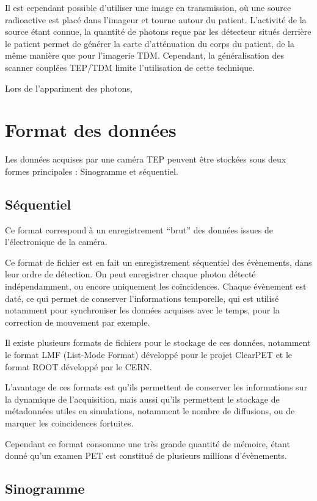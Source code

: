 Il est cependant possible d'utiliser une image en transmission, où une source radioactive est placé dans l'imageur et tourne autour du patient. L'activité de la source étant connue, la quantité de photons reçue par les détecteur situés derrière le patient permet de générer la carte d'atténuation du corps du patient, de la même manière que pour l'imagerie TDM. Cependant, la généralisation des scanner couplées TEP/TDM limite l'utilisation de cette technique.



Lors de l'appariment des photons, 


	\section{Format des données}
Les données acquises par une caméra TEP peuvent être stockées sous deux formes principales : Sinogramme et séquentiel.
		\subsection{Séquentiel}

Ce format correspond à un enregistrement ``brut'' des données issues de l'électronique de la caméra.

Ce format de fichier est en fait un enregistrement séquentiel des évènements, dans leur ordre de détection. On peut enregistrer chaque photon détecté indépendamment, ou encore uniquement les coïncidences. Chaque évènement est daté, ce qui permet de conserver l'informations temporelle, qui est utilisé notamment pour synchroniser les données acquises avec le temps, pour la correction de mouvement par exemple.

Il existe plusieurs formats de fichiers pour le stockage de ces données, notamment le format LMF (List-Mode Format) développé pour le projet ClearPET et le format ROOT développé par le CERN. 

L'avantage de ces formats est qu'ils permettent de conserver les informations sur la dynamique de l'acquisition, mais aussi qu'ils permettent le stockage de métadonnées utiles en simulations, notamment le nombre de diffusions, ou de marquer les coincidences fortuites.

Cependant ce format consomme une très grande quantité de mémoire, étant donné qu'un examen PET est constitué de plusieurs millions d'évènements.

		\subsection{Sinogramme}

